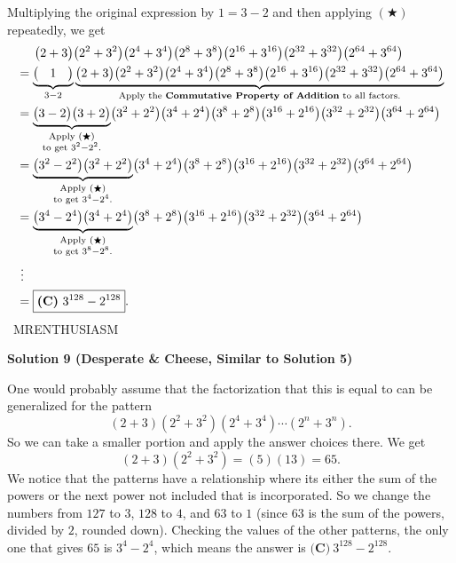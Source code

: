 \begin{enumerate}
 Multiplying the original expression by $1=3-2$ and then applying $(\bigstar)$ repeatedly, we get
 \begin{align*} &\hspace{5.125mm}\bigl(2+3\bigr)\bigl(2^2+3^2\bigr)\bigl(2^4+3^4\bigr)\bigl(2^8+3^8\bigr)\bigl(2^{16}+3^{16}\bigr)\bigl(2^{32}+3^{32}\bigr)\bigl(2^{64}+3^{64}\bigr) \\ &=\underbrace{\bigl(\hspace{3.25mm}1\hspace{3.25mm}\bigr)}_{3-2}\underbrace{\bigl(2+3\bigr)\bigl(2^2+3^2\bigr)\bigl(2^4+3^4\bigr)\bigl(2^8+3^8\bigr)\bigl(2^{16}+3^{16}\bigr)\bigl(2^{32}+3^{32}\bigr)\bigl(2^{64}+3^{64}\bigr)}_{\text{Apply the }\textbf{Commutative Property of Addition}\text{ to all factors.}} \\ &=\underbrace{\bigl(3-2\bigr)\bigl(3+2\bigr)}_{\substack{\text{Apply }(\bigstar) \\ \text{to get }3^2-2^2.}}\bigl(3^2+2^2\bigr)\bigl(3^4+2^4\bigr)\bigl(3^8+2^8\bigr)\bigl(3^{16}+2^{16}\bigr)\bigl(3^{32}+2^{32}\bigr)\bigl(3^{64}+2^{64}\bigr) \\ &=\underbrace{\bigl(3^2-2^2\bigr)\bigl(3^2+2^2\bigr)}_{\substack{\text{Apply }(\bigstar) \\ \text{to get }3^4-2^4.}}\bigl(3^4+2^4\bigr)\bigl(3^8+2^8\bigr)\bigl(3^{16}+2^{16}\bigr)\bigl(3^{32}+2^{32}\bigr)\bigl(3^{64}+2^{64}\bigr) \\ &=\underbrace{\bigl(3^4-2^4\bigr)\bigl(3^4+2^4\bigr)}_{\substack{\text{Apply }(\bigstar) \\ \text{to get }3^8-2^8.}}\bigl(3^8+2^8\bigr)\bigl(3^{16}+2^{16}\bigr)\bigl(3^{32}+2^{32}\bigr)\bigl(3^{64}+2^{64}\bigr) \\ & \ \vdots \\ &=\boxed{\textbf{(C)} ~3^{128}-2^{128}}. \end{align*}
~MRENTHUSIASM

 



\textbf{Solution 9 (Desperate & Cheese, Similar to Solution 5)}

One would probably assume that the factorization that this is equal to can be generalized for the pattern 
 \[(2+3)(2^2 + 3^2)(2^4+3^4)\cdots(2^n + 3^n).\]So we can take a smaller portion and apply the answer choices there. We get
 \[(2+3)(2^2 + 3^2) = (5)(13) = 65.\]We notice that the patterns have a relationship where its either the sum of the powers or the next power not included that is incorporated. So we change the numbers from $127$ to $3$, $128$ to $4$, and $63$ to $1$ (since $63$ is the sum of the powers, divided by $2$, rounded down). Checking the values of the other patterns, the only one that gives $65$ is $3^4 - 2^4$, which means the answer is $\boxed{\textbf{(C)} ~3^{128}-2^{128}}.$


\end{enumerate}
